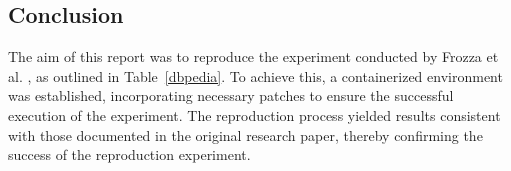 \documentclass[sigconf, nonacm]{acmart}
\begin{document}
\subsection{Conclusion}
The aim of this report was to reproduce the experiment conducted by Frozza et al. \cite{frozza2018approach}, as outlined in Table~\ref{dbpedia}. To achieve this, a containerized environment was established, incorporating necessary patches to ensure the successful execution of the experiment. The reproduction process yielded results consistent with those documented in the original research paper, thereby confirming the success of the reproduction experiment.





\end{document}
